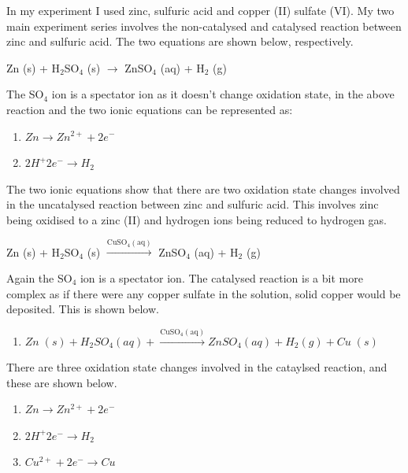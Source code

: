 In my experiment I used zinc, sulfuric acid and copper (II) sulfate (VI). My two main experiment series involves the non-catalysed and catalysed reaction between zinc and sulfuric acid. The two equations are shown below, respectively.

Zn (s) + H$_2$SO$_4$ (s) $\rightarrow$ ZnSO$_4$ (aq) + H$_2$ (g)

The SO$_4$ ion is a spectator ion as it doesn't change oxidation state, in the above reaction and the two ionic equations can be represented as:

\begin{enumerate}
\item $Zn \rightarrow Zn^{2+}  + 2 e^-$
\item $2 H^+ 2 e^- \rightarrow H_2$
\end{enumerate}

The two ionic equations show that there are two oxidation state changes involved in the uncatalysed reaction between zinc and sulfuric acid. This involves zinc being oxidised to a zinc (II) and hydrogen ions being reduced to hydrogen gas. 

Zn (s) + H$_2$SO$_4$ (s) $\xrightarrow{\mathrm{CuSO_4 (aq)}}$ ZnSO$_4$ (aq) + H$_2$ (g)

Again the SO$_4$ ion is a spectator ion. The catalysed reaction is a bit more complex as if there were any copper sulfate in the solution, solid copper would be deposited. This is shown below.
\begin{enumerate}
\item $Zn \; (s) + H_2SO_4 (aq) +  \xrightarrow{\mathrm{CuSO_4 (aq)}} ZnSO_4 (aq) + H_2 (g) + Cu \; (s)$
\end{enumerate}

There are three oxidation state changes involved in the cataylsed reaction, and these are shown below.

\begin{enumerate}
\item $Zn \rightarrow Zn^{2+} + 2 e^-$
\item $2 H^+ 2 e^- \rightarrow H_2$
\item $Cu^{2+} + 2 e^- \rightarrow Cu$
\end{enumerate}

